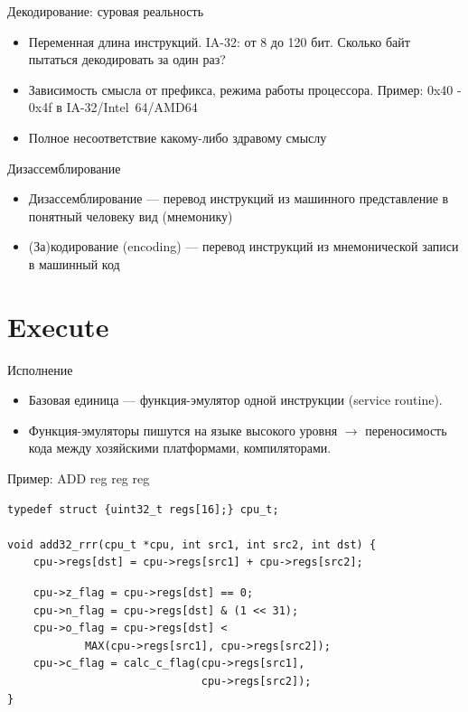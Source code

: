 \documentclass{beamer}
\begin{document}
\begin{frame}{Декодирование: суровая реальность}
\begin{itemize}
\item Переменная длина инструкций. IA-32: от 8 до 120 бит. Сколько байт пытаться декодировать за один раз?
\item Зависимость смысла от префикса, режима работы процессора. Пример: 0x40 - 0x4f в IA-32/Intel~64/AMD64
\item Полное несоответствие какому-либо здравому смыслу
\end{itemize}

\end{frame}

\begin{frame}{Дизассемблирование}
\begin{itemize}
\item Дизассемблирование — перевод инструкций из машинного представление в понятный
человеку вид (мнемонику)
\item (За)кодирование (encoding) — перевод инструкций из мнемонической записи в
машинный код
\end{itemize}
\end{frame}

\section{Execute}

\begin{frame}{Исполнение}

\begin{itemize}
\item Базовая единица — функция-эмулятор одной инструкции (service routine).
\item Функция-эмуляторы пишутся на языке высокого уровня $\rightarrow$ переносимость кода между хозяйскими
платформами, компиляторами.



\end{itemize}
\end{frame}

\begin{frame}[fragile]{Пример: ADD reg reg reg}
\begin{verbatim}
typedef struct {uint32_t regs[16];} cpu_t;

void add32_rrr(cpu_t *cpu, int src1, int src2, int dst) {
    cpu->regs[dst] = cpu->regs[src1] + cpu->regs[src2];
\end{verbatim}
\pause

\begin{verbatim}
    cpu->z_flag = cpu->regs[dst] == 0;
    cpu->n_flag = cpu->regs[dst] & (1 << 31);
    cpu->o_flag = cpu->regs[dst] < 
            MAX(cpu->regs[src1], cpu->regs[src2]);
    cpu->c_flag = calc_c_flag(cpu->regs[src1],
                              cpu->regs[src2]);
}
\end{verbatim}
\end{frame}
\end{document}
